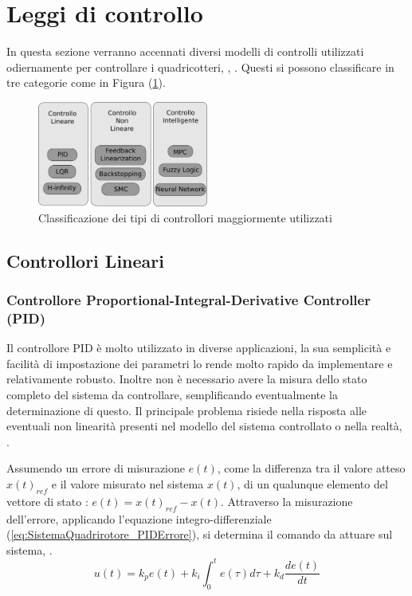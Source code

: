 \section{Leggi di controllo}
In questa sezione verranno accennati diversi modelli di controlli utilizzati odiernamente per controllare i quadricotteri, \cite{ZuluAndrew2014ARoC}, \cite{KimJinho2020ACSo}. Questi si possono classificare in tre categorie come in Figura (\ref{fig:categoriecontrolli}).
\begin{figure}
	\centering
	\includegraphics[width=0.5\textwidth]{SistemaQuadrirotore/Figure/Classificazione}
	\caption{Classificazione dei tipi di controllori maggiormente utilizzati \cite{KimJinho2020ACSo}}
	\label{fig:categoriecontrolli}
\end{figure}


\subsection{Controllori Lineari}
\subsubsection{Controllore Proportional-Integral-Derivative Controller (PID)}
Il controllore PID è molto utilizzato in diverse applicazioni, la sua semplicità e facilità di impostazione dei parametri lo rende molto rapido da implementare e relativamente robusto. Inoltre non è necessario avere la misura dello stato completo del sistema da controllare, semplificando eventualmente la determinazione di questo. Il principale problema risiede nella risposta alle eventuali non linearità presenti nel modello del sistema controllato o nella realtà, \cite{KimJinho2020ACSo}.

Assumendo un errore di misurazione $e(t)$, come la differenza tra il valore atteso $x(t)_{ref}$ e il valore misurato nel sistema $x(t)$, di un qualunque elemento del vettore di stato : $e(t)=x(t)_{ref}-x(t)$. Attraverso la misurazione dell'errore, applicando l'equazione integro-differenziale (\ref{eq:SistemaQuadrirotore_PIDErrore}), si determina il comando da attuare sul sistema, \cite{advanced-pid-control}.
\begin{equation}\label{eq:SistemaQuadrirotore_PIDErrore}
	u(t) = k_p e(t) + k_i \int_0^t e(\tau) d\tau + k_d \frac{d e(t)}{d t}
\end{equation}


